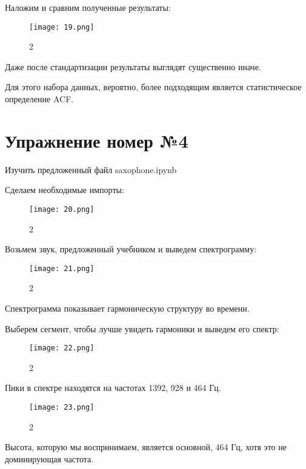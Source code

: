 \documentclass[10pt,a4paper,oneside]{article}
\begin{document}
Наложим и сравним полученные результаты: 

\begin{figure}[H]
        \centering
        \texttt{[image: 19.png]}
        \caption{2}
        \label{fig:first}
\end{figure}

Даже после стандартизации результаты выглядят существенно иначе.

Для этого набора данных, вероятно, более подходящим является статистическое определение ACF.

\section{Упражнение номер №4}

Изучить предложенный файл saxophone.ipynb

Сделаем необходимые импорты: 

\begin{figure}[H]
        \centering
        \texttt{[image: 20.png]}
        \caption{2}
        \label{fig:first}
\end{figure}

Возьмем звук, предложенный учебником и выведем спектрограмму: 

\begin{figure}[H]
        \centering
        \texttt{[image: 21.png]}
        \caption{2}
        \label{fig:first}
\end{figure}

Спектрограмма показывает гармоническую структуру во времени.

Выберем сегмент, чтобы лучше увидеть гармоники и выведем его спектр:

\begin{figure}[H]
        \centering
        \texttt{[image: 22.png]}
        \caption{2}
        \label{fig:first}
\end{figure}

Пики в спектре находятся на частотах 1392, 928 и 464 Гц.

\begin{figure}[H]
        \centering
        \texttt{[image: 23.png]}
        \caption{2}
        \label{fig:first}
\end{figure}

Высота, которую мы воспринимаем, является основной, 464 Гц, хотя это не доминирующая частота.
\end{document}
